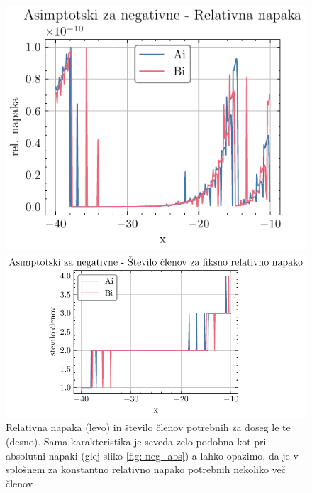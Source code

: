 \documentclass[slovene,11pt,a4paper]{article}
\begin{document}
\begin{figure}[H]%
  \centering
  \begin{minipage}{0.42\textwidth}
    \centering
    \includegraphics[width=\linewidth]{graphs/neg_rel_err.pdf}
  \end{minipage}\hfill
  \begin{minipage}{0.55\textwidth}
    \centering
    \includegraphics[width=\linewidth]{graphs/neg_rel_err_n.pdf}
  \end{minipage}
  \caption{Relativna napaka (levo) in število členov potrebnih za doseg le te (desno). Sama karakteristika je seveda zelo podobna kot pri absolutni napaki (glej sliko \ref{fig: neg_abs}) a lahko opazimo, da je v splošnem za konstantno relativno napako potrebnih nekoliko več členov}
  \label{fig: neg_rel}
\end{figure}
\end{document}
